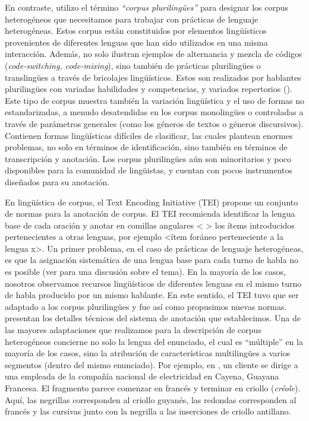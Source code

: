 \documentclass[output=paper]{langscibook}
\begin{document}
En contraste, utilizo el término \textit {“corpus plurilingües”} para designar los corpus heterogéneos que necesitamos para trabajar con prácticas de lenguaje heterogéneas. Estos corpus están constituidos por elementos lingüísticos provenientes de diferentes lenguas que han sido utilizados en una misma interacción. Además, no solo ilustran ejemplos de alternancia y mezcla de códigos (\textit {code-switching, code-mixing}), sino también de prácticas plurilingües o translingües a través de bricolajes lingüísticos. Estos son realizados por hablantes plurilingües con variadas habilidades y competencias, y variados repertorios (\citealt{BlommaertBackus2011}). Este tipo de corpus muestra también la variación lingüística y el uso de formas no estandarizadas, a menudo desatendidas en los corpus monolingües o controladas a través de parámetros generales (como los géneros de textos o géneros discursivos). Contienen formas lingüísticas difíciles de clasificar, las cuales plantean enormes problemas, no solo en términos de identificación, sino también en términos de transcripción y anotación. Los corpus plurilingües aún son minoritarios y poco disponibles para la comunidad de lingüistas, y cuentan con pocos instrumentos diseñados para su anotación.

En lingüística de corpus, el Text Encoding Initiative (TEI) propone un conjunto de normas para la anotación de corpus. El TEI recomienda identificar la lengua base de cada oración y anotar en comillas angulares < > los ítems introducidos pertenecientes a otras lenguas, por ejemplo <ítem foráneo perteneciente a la lengua x>. Un primer problema, en el caso de prácticas de lenguaje heterogéneas, es que la asignación sistemática de una lengua base para cada turno de habla no es posible (ver \citet{LégliseAlby2016} para una discusión sobre el tema). En la mayoría de los casos, nosotros observamos recursos lingüísticos de diferentes lenguas en el mismo turno de habla producido por un mismo hablante. En este sentido, el TEI tuvo que ser adaptado a los corpus plurilingües y fue así como propusimos nuevas normas. \citet{VaillantLéglise2014} presentan los detalles técnicos del sistema de anotación que establecimos. Una de las mayores adaptaciones que realizamos para la descripción de corpus heterogéneos concierne no solo la lengua del enunciado, el cual es “múltiple” en la mayoría de los casos, sino la atribución de características multilingües a varios segmentos (dentro del mismo enunciado). Por ejemplo, en , un cliente se dirige a una empleada de la compañía nacional de electricidad en Cayena, Guayana Francesa. El fragmento parece comenzar en francés y terminar en criollo (\textit {créole}). Aquí, las negrillas corresponden al criollo guyanés, las redondas corresponden al francés y las cursivas junto con la negrilla a las inserciones de criollo antillano.
\end{document}
